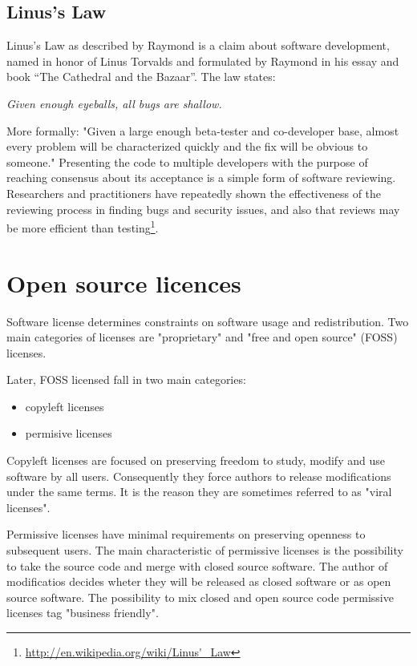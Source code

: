 \documentclass[times, utf8, seminar]{fit}
\begin{document}
\subsection{Linus's Law}

Linus's Law as described by Raymond is a claim about software development, named in honor of Linus Torvalds and formulated by Raymond in his essay and book ``The Cathedral and the Bazaar''\citep{bazaar}. The law states:

\begin{center}
\emph{\large{Given enough eyeballs, all bugs are shallow.}}
\end{center}

More formally: "Given a large enough beta-tester and co-developer base, almost every problem will be characterized quickly and the fix will be obvious to someone." Presenting the code to multiple developers with the purpose of reaching consensus about its acceptance is a simple form of software reviewing. Researchers and practitioners have repeatedly shown the effectiveness of the reviewing process in finding bugs and security issues, and also that reviews may be more efficient than testing\footnote{\url{http://en.wikipedia.org/wiki/Linus'\_Law}}.

\section{Open source licences}

Software license determines constraints on software usage and redistribution. Two main categories of licenses are "proprietary" and "free and open source" (FOSS) licenses.

Later, FOSS licensed fall in two main categories:
\begin{itemize}
  \item copyleft licenses
  \item permisive licenses 
\end{itemize} 

Copyleft licenses are focused on preserving freedom to study, modify and use software by all users. Consequently they force authors to release modifications under the same terms. It is the reason they are sometimes referred to as "viral licenses".

Permissive licenses have minimal requirements on preserving openness to subsequent users. The main characteristic of permissive licenses is the possibility to take the source code and merge with closed source software. The author of modificatios decides wheter they will be released as closed software or as open source software. The possibility to mix closed and open source code permissive licenses tag "business friendly".
\end{document}
